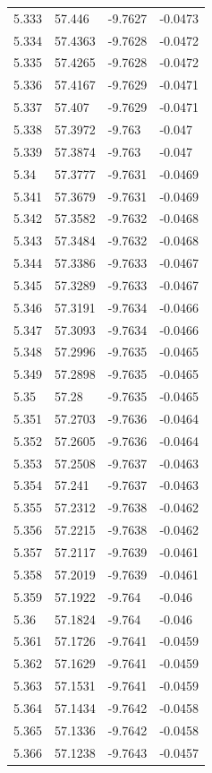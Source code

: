 \begin{tabular}{llll}
5.333 & 57.446 & -9.7627 & -0.0473 \\
5.334 & 57.4363 & -9.7628 & -0.0472 \\
5.335 & 57.4265 & -9.7628 & -0.0472 \\
5.336 & 57.4167 & -9.7629 & -0.0471 \\
5.337 & 57.407 & -9.7629 & -0.0471 \\
5.338 & 57.3972 & -9.763 & -0.047 \\
5.339 & 57.3874 & -9.763 & -0.047 \\
5.34 & 57.3777 & -9.7631 & -0.0469 \\
5.341 & 57.3679 & -9.7631 & -0.0469 \\
5.342 & 57.3582 & -9.7632 & -0.0468 \\
5.343 & 57.3484 & -9.7632 & -0.0468 \\
5.344 & 57.3386 & -9.7633 & -0.0467 \\
5.345 & 57.3289 & -9.7633 & -0.0467 \\
5.346 & 57.3191 & -9.7634 & -0.0466 \\
5.347 & 57.3093 & -9.7634 & -0.0466 \\
5.348 & 57.2996 & -9.7635 & -0.0465 \\
5.349 & 57.2898 & -9.7635 & -0.0465 \\
5.35 & 57.28 & -9.7635 & -0.0465 \\
5.351 & 57.2703 & -9.7636 & -0.0464 \\
5.352 & 57.2605 & -9.7636 & -0.0464 \\
5.353 & 57.2508 & -9.7637 & -0.0463 \\
5.354 & 57.241 & -9.7637 & -0.0463 \\
5.355 & 57.2312 & -9.7638 & -0.0462 \\
5.356 & 57.2215 & -9.7638 & -0.0462 \\
5.357 & 57.2117 & -9.7639 & -0.0461 \\
5.358 & 57.2019 & -9.7639 & -0.0461 \\
5.359 & 57.1922 & -9.764 & -0.046 \\
5.36 & 57.1824 & -9.764 & -0.046 \\
5.361 & 57.1726 & -9.7641 & -0.0459 \\
5.362 & 57.1629 & -9.7641 & -0.0459 \\
5.363 & 57.1531 & -9.7641 & -0.0459 \\
5.364 & 57.1434 & -9.7642 & -0.0458 \\
5.365 & 57.1336 & -9.7642 & -0.0458 \\
5.366 & 57.1238 & -9.7643 & -0.0457 \\

\end{tabular}
